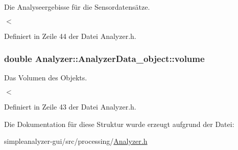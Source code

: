 Die Analyseergebisse für die Sensordatensätze. 

$<$ 

Definiert in Zeile 44 der Datei Analyzer.\-h.

\hypertarget{structAnalyzer_1_1AnalyzerData__object_a78ddeb311ff702e110fc1d483d826920}{
\subsubsection[{volume}]{\setlength{\rightskip}{0pt plus 5cm}double Analyzer\-::\-Analyzer\-Data\-\_\-object\-::volume}}\label{structAnalyzer_1_1AnalyzerData__object_a78ddeb311ff702e110fc1d483d826920}


Das Volumen des Objekts. 

$<$ 

Definiert in Zeile 43 der Datei Analyzer.\-h.



Die Dokumentation für diese Struktur wurde erzeugt aufgrund der Datei\-:\begin{DoxyCompactItemize}
\item 
simpleanalyzer-\/gui/src/processing/\hyperlink{Analyzer_8h}{Analyzer.\-h}\end{DoxyCompactItemize}

